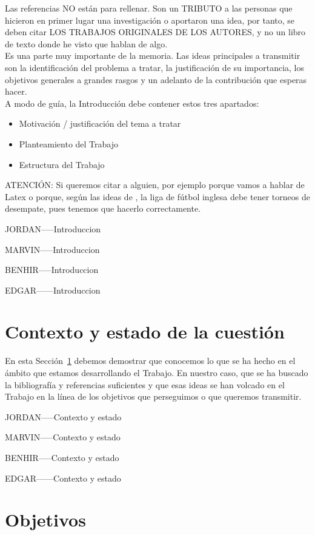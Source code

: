 \documentclass[11pt,a4paper,spanish]{book}
\begin{document}
Las referencias NO están para rellenar. Son un TRIBUTO a las personas que hicieron en primer lugar una investigación o aportaron una idea, por tanto, se deben citar LOS TRABAJOS ORIGINALES DE LOS AUTORES, y no un libro de texto donde he visto que hablan de algo.\\

Es una parte muy importante de la memoria. Las ideas principales a transmitir son la identificación del problema a tratar, la justificación de su importancia, los objetivos generales a grandes rasgos y un adelanto de la contribución que esperas hacer.\\

A modo de guía, la Introducción debe contener estos tres apartados:
\begin{itemize}
\item Motivación / justificación del tema a tratar
\item Planteamiento del Trabajo
\item Estructura del Trabajo
\end{itemize}


ATENCIÓN:  Si queremos citar a alguien, por ejemplo porque vamos a hablar de Latex \citep{lamport1994} o porque, según las ideas de \cite{ackerman2017}, la liga de fútbol inglesa debe tener torneos de desempate, pues tenemos que hacerlo correctamente.

JORDAN-----Introduccion

MARVIN-----Introduccion

BENHIR-----Introduccion

EDGAR------Introduccion


\chapter{Contexto y estado de la cuestión}\label{contexto}

En esta Sección~\ref{contexto} debemos demostrar que conocemos lo que se ha hecho en el ámbito que estamos desarrollando el Trabajo. En nuestro caso, que se ha buscado la bibliografía y referencias suficientes y que esas ideas se han volcado en el Trabajo en la línea de los objetivos que perseguimos o que queremos transmitir.

JORDAN-----Contexto y estado

MARVIN-----Contexto y estado

BENHIR-----Contexto y estado

EDGAR------Contexto y estado


\chapter{Objetivos}
\end{document}
